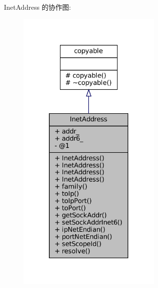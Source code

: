 Inet\+Address 的协作图\+:
\nopagebreak
\begin{figure}[H]
\begin{center}
\leavevmode
\includegraphics[width=201pt]{classmuduo_1_1net_1_1InetAddress__coll__graph}
\end{center}
\end{figure}
